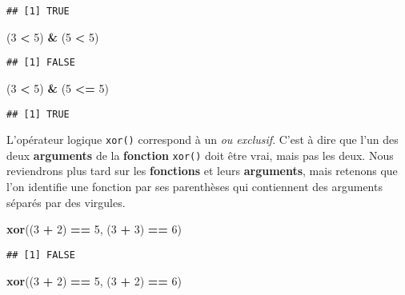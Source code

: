 \documentclass[]{book}
\newenvironment{Shaded}{\begin{snugshade}}{\end{snugshade}}
\newcommand{\KeywordTok}[1]{\textcolor[rgb]{0.13,0.29,0.53}{\textbf{#1}}}
\newcommand{\DecValTok}[1]{\textcolor[rgb]{0.00,0.00,0.81}{#1}}
\newcommand{\StringTok}[1]{\textcolor[rgb]{0.31,0.60,0.02}{#1}}
\newcommand{\OperatorTok}[1]{\textcolor[rgb]{0.81,0.36,0.00}{\textbf{#1}}}
\newcommand{\NormalTok}[1]{#1}
\theoremstyle{definition}
\theoremstyle{definition}
\theoremstyle{definition}
\theoremstyle{remark}
\begin{document}
\begin{verbatim}
## [1] TRUE
\end{verbatim}

\begin{Shaded}
\begin{Highlighting}[]
\NormalTok{(}\DecValTok{3} \OperatorTok{<}\StringTok{ }\DecValTok{5}\NormalTok{) }\OperatorTok{&}\StringTok{ }\NormalTok{(}\DecValTok{5} \OperatorTok{<}\StringTok{ }\DecValTok{5}\NormalTok{)}
\end{Highlighting}
\end{Shaded}

\begin{verbatim}
## [1] FALSE
\end{verbatim}

\begin{Shaded}
\begin{Highlighting}[]
\NormalTok{(}\DecValTok{3} \OperatorTok{<}\StringTok{ }\DecValTok{5}\NormalTok{) }\OperatorTok{&}\StringTok{ }\NormalTok{(}\DecValTok{5} \OperatorTok{<=}\StringTok{ }\DecValTok{5}\NormalTok{)}
\end{Highlighting}
\end{Shaded}

\begin{verbatim}
## [1] TRUE
\end{verbatim}

L'opérateur logique \texttt{xor()} correspond à un \emph{ou exclusif}.
C'est à dire que l'un des deux \textbf{arguments} de la
\textbf{fonction} \texttt{xor()} doit être vrai, mais pas les deux. Nous
reviendrons plus tard sur les \textbf{fonctions} et leurs
\textbf{arguments}, mais retenons que l'on identifie une fonction par
ses parenthèses qui contiennent des arguments séparés par des virgules.

\begin{Shaded}
\begin{Highlighting}[]
\KeywordTok{xor}\NormalTok{((}\DecValTok{3} \OperatorTok{+}\StringTok{ }\DecValTok{2}\NormalTok{) }\OperatorTok{==}\StringTok{ }\DecValTok{5}\NormalTok{, (}\DecValTok{3} \OperatorTok{+}\StringTok{ }\DecValTok{3}\NormalTok{) }\OperatorTok{==}\StringTok{ }\DecValTok{6}\NormalTok{)}
\end{Highlighting}
\end{Shaded}

\begin{verbatim}
## [1] FALSE
\end{verbatim}

\begin{Shaded}
\begin{Highlighting}[]
\KeywordTok{xor}\NormalTok{((}\DecValTok{3} \OperatorTok{+}\StringTok{ }\DecValTok{2}\NormalTok{) }\OperatorTok{==}\StringTok{ }\DecValTok{5}\NormalTok{, (}\DecValTok{3} \OperatorTok{+}\StringTok{ }\DecValTok{2}\NormalTok{) }\OperatorTok{==}\StringTok{ }\DecValTok{6}\NormalTok{)}
\end{Highlighting}
\end{Shaded}
\end{document}
